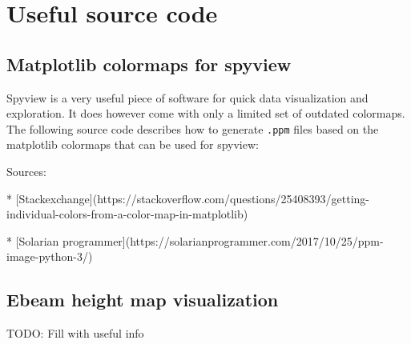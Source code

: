 \chapter{Useful source code}

\clearpage
\section{Matplotlib colormaps for spyview}\label{app:spyview}
Spyview is a very useful piece of software for quick data visualization and exploration.
It does however come with only a limited set of outdated colormaps.
The following source code describes how to generate \texttt{.ppm} files based on the matplotlib colormaps that can be used for spyview:



Sources:

* [Stackexchange](https://stackoverflow.com/questions/25408393/getting-individual-colors-from-a-color-map-in-matplotlib)

* [Solarian programmer](https://solarianprogrammer.com/2017/10/25/ppm-image-python-3/)

\section{Ebeam height map visualization}
TODO: Fill with useful info




